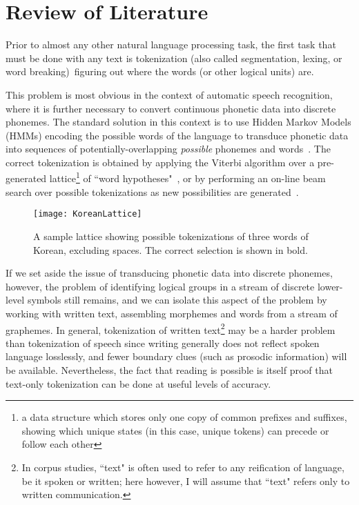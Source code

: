 \chapter{Review of Literature}

Prior to almost any other natural language processing task, the first task that must be done with any text is tokenization (also called segmentation, lexing, or word breaking)\textemdash~figuring out where the words (or other logical units) are. 

This problem is most obvious in the context of automatic speech recognition, where it is further necessary to convert continuous phonetic data into discrete phonemes. The standard solution in this context is to use Hidden Markov Models (HMMs) encoding the possible words of the language to transduce phonetic data into sequences of potentially-overlapping \textit{possible} phonemes and words~\cite{varile97}. The correct tokenization is obtained by applying the Viterbi algorithm over a pre-generated lattice\footnote{a data structure which stores only one copy of common prefixes and suffixes, showing which unique states (in this case, unique tokens) can precede or follow each other} of ``word hypotheses"~\cite{aubert94}, or by performing an on-line beam search over possible tokenizations as new possibilities are generated~\cite{paul94}.

\begin{figure}
	\centering
	\texttt{[image: KoreanLattice]}
	\caption[Token Lattice]{A sample lattice showing possible tokenizations of three words of Korean, excluding spaces. The correct selection is shown in bold.}
	\label{latticediagram}
\end{figure}

If we set aside the issue of transducing phonetic data into discrete phonemes, however, the problem of identifying logical groups in a stream of discrete lower-level symbols still remains, and we can isolate this aspect of the problem by working with written text, assembling morphemes and words from a stream of graphemes. In general, tokenization of written text\footnote{In corpus studies, ``text" is often used to refer to any reification of language, be it spoken or written; here however, I will assume that ``text" refers only to written communication.} may be a harder problem than tokenization of speech since writing generally does not reflect spoken language losslessly, and fewer boundary clues (such as prosodic information) will be available. Nevertheless, the fact that reading is possible is itself proof that text-only tokenization can be done at useful levels of accuracy.

